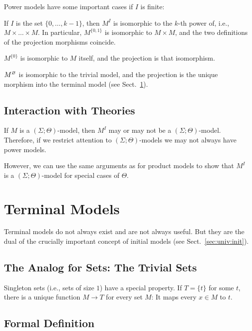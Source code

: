 \begin{example}
Power models have some important cases if $I$ is finite:
\begin{compactitem}
\item If $I$ is the set $\{0,\ldots,k-1\}$, then $M^I$ is isomorphic to the $k$-th power of, i.e., $M\times\ldots\times M$.
In particular, $M^{\{0,1\}}$ is isomorphic to $M\times M$, and the two definitions of the projection morphisms coincide.
\item $M^{\{0\}}$ is isomorphic to $M$ itself, and the projection is that isomorphism.
\item $M^\varnothing$ is isomorphic to the trivial model, and the projection is the unique morphism into the terminal model (see Sect.~\ref{sec:univ:term}).
\end{compactitem}
\end{example}

\subsection{Interaction with Theories}

If $M$ is a $(\Sigma;\Theta)$-model, then $M^I$ may or may not be a $(\Sigma;\Theta)$-model.
Therefore, if we restrict attention to $(\Sigma;\Theta)$-models we may not always have power models.

However, we can use the same arguments as for product models to show that $M^I$ is a $(\Sigma;\Theta)$-model for special cases of $\Theta$.

\section{Terminal Models}\label{sec:univ:term}

Terminal models do not always exist and are not always useful.
But they are the dual of the crucially important concept of initial models (see Sect.~\ref{sec:univ:init}).

\subsection{The Analog for Sets: The Trivial Sets}

Singleton sets (i.e., sets of size $1$) have a special property.
If $T=\{t\}$ for some $t$, there is a unique function $M\to T$ for every set $M$: It maps every $x\in M$ to $t$.

\subsection{Formal Definition}

